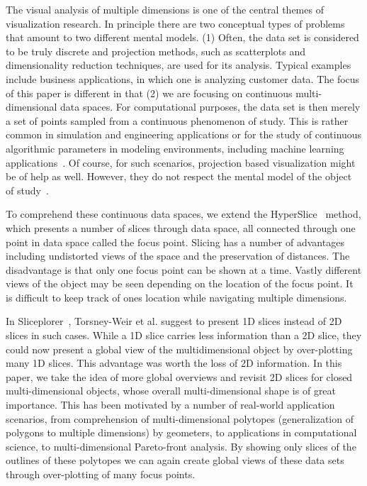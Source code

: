 The visual analysis of multiple dimensions is one of the central themes of
visualization research. In principle there are two conceptual types of problems
that amount to two different mental models. (1) Often, the data set is considered to be truly discrete 
and projection methods, such as 
scatterplots and dimensionality reduction techniques, are used for its analysis.
Typical examples include business applications, in which one is analyzing
customer data.
The focus of
this paper is different in that (2) we are focusing on continuous multi-dimensional data spaces. For computational purposes, the data set is then merely a
set of points sampled from a continuous phenomenon of study. This is
rather common in simulation and engineering applications or for the study of
continuous algorithmic parameters in modeling environments, including machine
learning applications~\cite{Sedlmair:2014}. Of course, for such scenarios, projection based
visualization might be of help as well. However, they do not respect the mental
model of the object of study~\cite{Tory:2004}.

To comprehend these continuous data spaces, we extend the
HyperSlice~\cite{Wijk:1993} method, which presents a number of slices through
data space, all connected through one point in data space called the focus
point. Slicing has a number of advantages including undistorted views of the
space and the preservation of distances. The disadvantage is that only one
focus point can be shown at a time. Vastly different views of the object may be
seen depending on the location of the focus point. 
It is difficult to keep track of ones location while navigating multiple
dimensions.

In Sliceplorer~\cite{Torsney-Weir:2017a}, Torsney-Weir et al. suggest to
present 1D slices instead of 2D slices in such cases. While a 1D slice carries
less information than a 2D slice, they could now present a global view of the
multidimensional object by over-plotting many 1D slices. This advantage was
worth the loss of 2D information. In this paper, we take the idea of more global overviews and revisit 2D 
slices for closed multi-dimensional objects, whose overall multi-dimensional shape is
of great importance. This has been motivated by a number of real-world
application scenarios, from comprehension of multi-dimensional polytopes 
(generalization of polygons to multiple dimensions) by 
geometers, to applications in computational science, to
multi-dimensional Pareto-front analysis. By showing only slices of the outlines of these
polytopes we can again create global views of these data sets through
over-plotting of many focus points.

